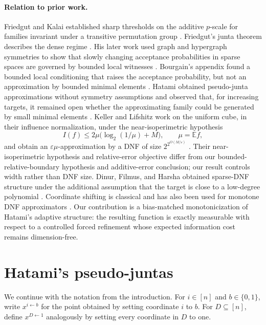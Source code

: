\documentclass[11pt,letterpaper]{article}
\theoremstyle{definition}
\theoremstyle{remark}
\newcommand{\bits}{\{0,1\}}
\newcommand{\E}{\mathbb E}
\begin{document}
\paragraph{Relation to prior work.}
Friedgut and Kalai established sharp thresholds on the additive $p$-scale for
families invariant under a transitive permutation group
\cite{FriedgutKalai1996}.  Friedgut's junta theorem describes the dense regime
\cite{Friedgut1998}.  His later work used graph and hypergraph symmetries to
show that slowly changing acceptance probabilities in sparse spaces are
governed by bounded local witnesses \cite{Friedgut1999}.  Bourgain's appendix
found a bounded local conditioning that raises the acceptance probability, but
not an approximation by bounded minimal elements
\cite[Appendix]{Friedgut1999}.  Hatami obtained pseudo-junta approximations
without symmetry assumptions and observed that, for increasing targets, it
remained open whether the approximating family could be generated by small
minimal elements \cite[Section~6]{Hatami2012}.  Keller and Lifshitz work
on the uniform cube, in their influence normalization, under the
near-isoperimetric hypothesis
\[
       I(f)\le 2\mu\bigl(\log_2(1/\mu)+M\bigr),\qquad \mu=\E f,
\]
and obtain an $\varepsilon\mu$-approximation by a DNF of size
$2^{2^{O(M/\varepsilon)}}$ \cite{KellerLifshitz2018}.  Their
near-isoperimetric hypothesis and relative-error objective differ from our
bounded-relative-boundary hypothesis and additive-error conclusion; our result
controls width rather than DNF size.  Dinur, Filmus, and Harsha obtained
sparse-DNF structure under the additional assumption that the target is close
to a low-degree polynomial
\cite{DinurFilmusHarsha2024}.  Coordinate shifting is classical and has also
been used for monotone DNF approximators \cite{BlaisHastadServedioTan2014}.
Our contribution is a bias-matched monotonicization of Hatami's adaptive
structure: the resulting function is exactly measurable with respect to a
controlled forced refinement whose expected information cost remains
dimension-free.

\section{Hatami's pseudo-juntas}
\label{sec:pseudo-juntas}

We continue with the notation from the introduction.  For $i\in[n]$ and
$b\in\bits$, write $x^{i\leftarrow b}$ for the point obtained by setting
coordinate $i$ to $b$.  For $D\subseteq[n]$, define $x^{D\leftarrow1}$
analogously by setting every coordinate in $D$ to one.
\end{document}
